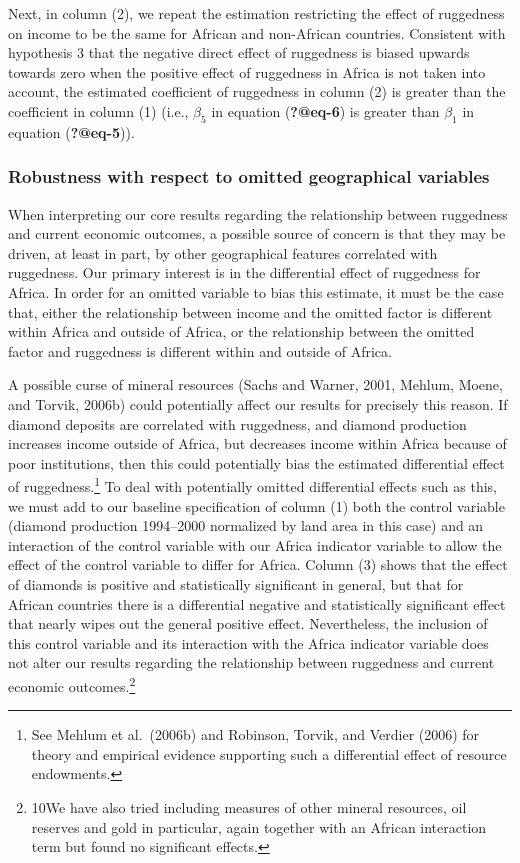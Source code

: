 \documentclass[
  letterpaper,
  DIV=11,
  numbers=noendperiod]{scrartcl}
\begin{document}
Next, in column (2), we repeat the estimation restricting the effect of
ruggedness on income to be the same for African and non-African
countries. Consistent with hypothesis 3 that the negative direct effect
of ruggedness is biased upwards towards zero when the positive effect of
ruggedness in Africa is not taken into account, the estimated
coefficient of ruggedness in column (2) is greater than the coefficient
in column (1) (i.e., \(\beta_5\) in equation (\textbf{?@eq-6}) is
greater than \(\beta_1\) in equation (\textbf{?@eq-5})).

\subsubsection{Robustness with respect to omitted geographical
variables}\label{robustness-with-respect-to-omitted-geographical-variables}

When interpreting our core results regarding the relationship between
ruggedness and current economic outcomes, a possible source of concern
is that they may be driven, at least in part, by other geographical
features correlated with ruggedness. Our primary interest is in the
differential effect of ruggedness for Africa. In order for an omitted
variable to bias this estimate, it must be the case that, either the
relationship between income and the omitted factor is different within
Africa and outside of Africa, or the relationship between the omitted
factor and ruggedness is different within and outside of Africa.

A possible curse of mineral resources (Sachs and Warner, 2001, Mehlum,
Moene, and Torvik, 2006b) could potentially affect our results for
precisely this reason. If diamond deposits are correlated with
ruggedness, and diamond production increases income outside of Africa,
but decreases income within Africa because of poor institutions, then
this could potentially bias the estimated differential effect of
ruggedness.\footnote{See Mehlum et al.~(2006b) and Robinson, Torvik, and
  Verdier (2006) for theory and empirical evidence supporting such a
  differential effect of resource endowments.} To deal with potentially
omitted differential effects such as this, we must add to our baseline
specification of column (1) both the control variable (diamond
production 1994--2000 normalized by land area in this case) and an
interaction of the control variable with our Africa indicator variable
to allow the effect of the control variable to differ for Africa. Column
(3) shows that the effect of diamonds is positive and statistically
significant in general, but that for African countries there is a
differential negative and statistically significant effect that nearly
wipes out the general positive effect. Nevertheless, the inclusion of
this control variable and its interaction with the Africa indicator
variable does not alter our results regarding the relationship between
ruggedness and current economic outcomes.\footnote{10We have also tried
  including measures of other mineral resources, oil reserves and gold
  in particular, again together with an African interaction term but
  found no significant effects.}
\end{document}
